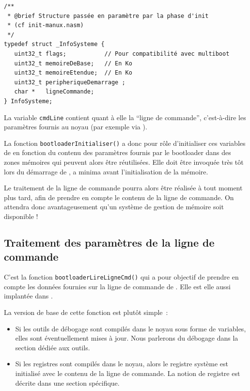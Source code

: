 \begin{lstlisting}
/**
 * @brief Structure passée en paramètre par la phase d'init
 * (cf init-manux.nasm)
 */
typedef struct _InfoSysteme {
   uint32_t flags;           // Pour compatibilité avec multiboot
   uint32_t memoireDeBase;   // En Ko
   uint32_t memoireEtendue;  // En Ko
   uint32_t peripheriqueDemarrage ;
   char *   ligneCommande;
} InfoSysteme;
\end{lstlisting}

   La variable \lstinline!cmdLine! contient quant à elle la ``ligne de
commande'', c'est-à-dire les paramètres fournis au noyau (par exemple
via \grub).

   La fonction \lstinline!bootloaderInitialiser()! a donc pour rôle
d'initialiser ces variables de \manux en fonction du contenu des
paramètres fournis par le bootloader dans des zones mémoires qui
peuvent alors être réutilisées. Elle doit être invoquée très tôt lors
du démarrage de \manux, a minima avant l'initialisation de la mémoire.

   Le traitement de la ligne de commande pourra alors être réalisée à tout moment plus tard, afin de prendre en compte le contenu
de la ligne de commande. On attendra donc avantageusement qu'un système
de gestion de mémoire soit disponible !

\subsection{Traitement des paramètres de la ligne de commande}

   C'est la fonction \lstinline!bootloaderLireLigneCmd()! qui a pour
objectif de prendre en compte les données fournies sur la ligne de
commande de \grub. Elle est elle aussi implantée dans
.

La version de base de cette fonction est plutôt simple~:

\begin{itemize}
   \item Si les outils de débogage sont compilés dans le noyau sous
     forme de variables, elles sont éventuellement mises à jour. Nous
     parlerons du débogage dans la section dédiée aux outils.
   \item Si les registres sont compilés dans le noyau, alors le
     registre système est initialisé avec le contenu de la ligne de
     commande. La notion de registre est décrite dans une section
     spécifique.
\end{itemize}

